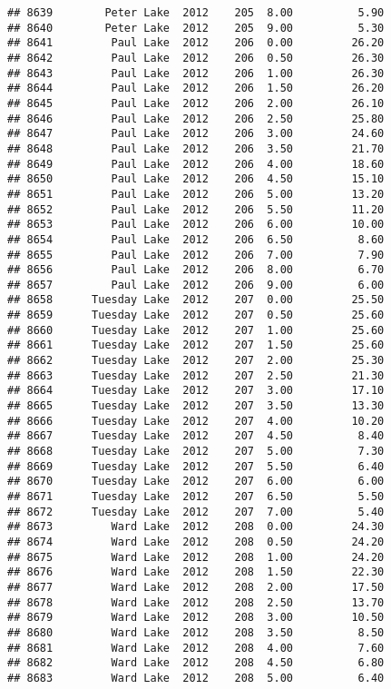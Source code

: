 \documentclass[
]{article}
\begin{document}
\begin{verbatim}
## 8639        Peter Lake  2012    205  8.00          5.90
## 8640        Peter Lake  2012    205  9.00          5.30
## 8641         Paul Lake  2012    206  0.00         26.20
## 8642         Paul Lake  2012    206  0.50         26.30
## 8643         Paul Lake  2012    206  1.00         26.30
## 8644         Paul Lake  2012    206  1.50         26.20
## 8645         Paul Lake  2012    206  2.00         26.10
## 8646         Paul Lake  2012    206  2.50         25.80
## 8647         Paul Lake  2012    206  3.00         24.60
## 8648         Paul Lake  2012    206  3.50         21.70
## 8649         Paul Lake  2012    206  4.00         18.60
## 8650         Paul Lake  2012    206  4.50         15.10
## 8651         Paul Lake  2012    206  5.00         13.20
## 8652         Paul Lake  2012    206  5.50         11.20
## 8653         Paul Lake  2012    206  6.00         10.00
## 8654         Paul Lake  2012    206  6.50          8.60
## 8655         Paul Lake  2012    206  7.00          7.90
## 8656         Paul Lake  2012    206  8.00          6.70
## 8657         Paul Lake  2012    206  9.00          6.00
## 8658      Tuesday Lake  2012    207  0.00         25.50
## 8659      Tuesday Lake  2012    207  0.50         25.60
## 8660      Tuesday Lake  2012    207  1.00         25.60
## 8661      Tuesday Lake  2012    207  1.50         25.60
## 8662      Tuesday Lake  2012    207  2.00         25.30
## 8663      Tuesday Lake  2012    207  2.50         21.30
## 8664      Tuesday Lake  2012    207  3.00         17.10
## 8665      Tuesday Lake  2012    207  3.50         13.30
## 8666      Tuesday Lake  2012    207  4.00         10.20
## 8667      Tuesday Lake  2012    207  4.50          8.40
## 8668      Tuesday Lake  2012    207  5.00          7.30
## 8669      Tuesday Lake  2012    207  5.50          6.40
## 8670      Tuesday Lake  2012    207  6.00          6.00
## 8671      Tuesday Lake  2012    207  6.50          5.50
## 8672      Tuesday Lake  2012    207  7.00          5.40
## 8673         Ward Lake  2012    208  0.00         24.30
## 8674         Ward Lake  2012    208  0.50         24.20
## 8675         Ward Lake  2012    208  1.00         24.20
## 8676         Ward Lake  2012    208  1.50         22.30
## 8677         Ward Lake  2012    208  2.00         17.50
## 8678         Ward Lake  2012    208  2.50         13.70
## 8679         Ward Lake  2012    208  3.00         10.50
## 8680         Ward Lake  2012    208  3.50          8.50
## 8681         Ward Lake  2012    208  4.00          7.60
## 8682         Ward Lake  2012    208  4.50          6.80
## 8683         Ward Lake  2012    208  5.00          6.40

\end{verbatim}
\end{document}
